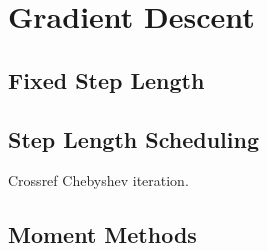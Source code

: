 \chapter{Gradient Descent}
\label{Ch: 10-Gra-Des}
\section{Fixed Step Length}
\section{Step Length Scheduling}
Crossref Chebyshev iteration.
\section{Moment Methods}
